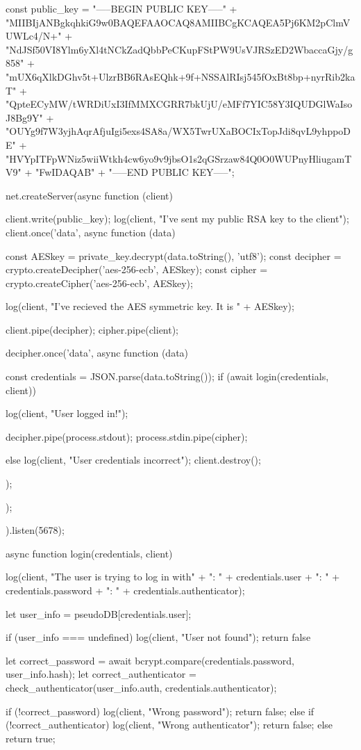 \begin{Answer}[ref={proxy-auth}]
\begin{js}
const public_key = "-----BEGIN PUBLIC KEY-----\n" +
    "MIIBIjANBgkqhkiG9w0BAQEFAAOCAQ8AMIIBCgKCAQEA5Pj6KM2pClmVUWLc4/N+\n" +
    "NdJSf50VI8Ylm6yXl4tNCkZadQbbPeCKupFStPW9UsVJRSzED2WbaccaGjy/g858\n" +
    "mUX6qXlkDGhv5t+UlzrBB6RAsEQhk+9f+NSSAlRIsj545fOxBt8bp+nyrRib2kaT\n" +
    "QpteECyMW/tWRDiUxI3IfMMXCGRR7bkUjU/eMFf7YIC58Y3IQUDGlWaIsoJ8Bg9Y\n" +
    "OUYg9f7W3yjhAqrAfjuIgi5exs4SA8a/WX5TwrUXaBOCIxTopJdi8qvL9yhppoDE\n" +
    "HVYpITFpWNiz5wiiWtkh4cw6yo9v9jbsO1s2qGSrzaw84Q0O0WUPnyHliugamTV9\n" +
    "FwIDAQAB\n" +
    "-----END PUBLIC KEY-----";

net.createServer(async function (client) {
    client.write(public_key);
    log(client, "I've sent my public RSA key to the client");
    client.once('data', async function (data) {
        const AESkey = private_key.decrypt(data.toString(), 'utf8');
        const decipher = crypto.createDecipher('aes-256-ecb', AESkey);
        const cipher = crypto.createCipher('aes-256-ecb', AESkey);

        log(client, "I've recieved the AES symmetric key. It is " + AESkey);

        client.pipe(decipher);
        cipher.pipe(client);

        decipher.once('data', async function (data) {
            const credentials = JSON.parse(data.toString());
            if (await login(credentials, client)) {
                log(client, "User logged in!");

                decipher.pipe(process.stdout);
                process.stdin.pipe(cipher);

            } else {
                log(client, "User credentials incorrect");
                client.destroy();
            }
        });
    });
}).listen(5678);


async function login(credentials, client) {
    log(client, "The user is trying to log in with" +
        "\n\tUser: " + credentials.user +
        "\n\tPassword: " + credentials.password +
        "\n\tAuthenticator: " + credentials.authenticator);

    let user_info = pseudoDB[credentials.user];

    if (user_info === undefined) {
        log(client, "User not found");
        return false
    }

    let correct_password = await bcrypt.compare(credentials.password, user_info.hash);
    let correct_authenticator = check_authenticator(user_info.auth, credentials.authenticator);

    if (!correct_password) {
        log(client, "Wrong password");
        return false;
    } else if (!correct_authenticator) {
        log(client, "Wrong authenticator");
        return false;
    } else {
        return true;
    }
}


\end{js}
\end{Answer}
